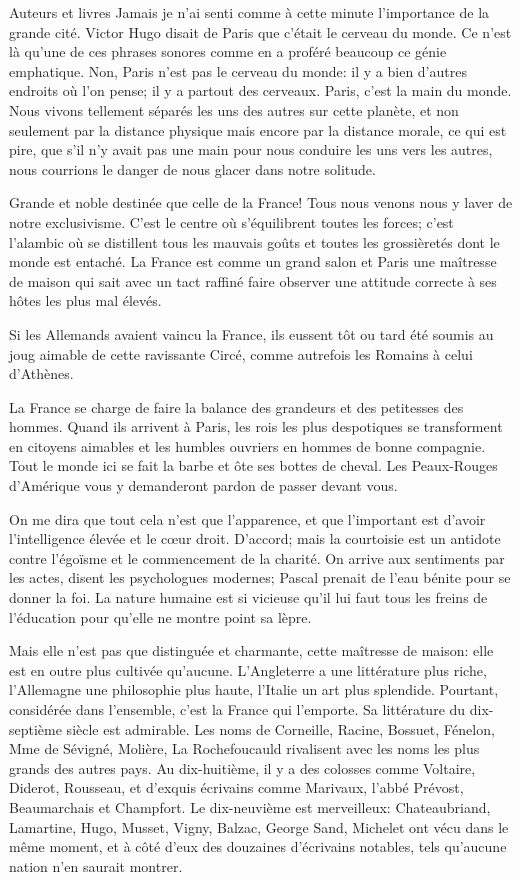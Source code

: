 \begin{chapter}{Auteurs et livres}
Jamais je n'ai senti comme à cette minute l'importance de la grande
cité. Victor Hugo disait de Paris que c'était le cerveau du monde. Ce
n'est là qu'une de ces phrases sonores comme en a proféré beaucoup ce
génie emphatique. Non, Paris n'est pas le cerveau du monde: il y a bien
d'autres endroits où l'on pense; il y a partout des cerveaux. Paris,
c'est la main du monde. Nous vivons tellement séparés les uns des autres
sur cette planète, et non seulement par la distance physique mais encore
par la distance morale, ce qui est pire, que s'il n'y avait pas une main
pour nous conduire les uns vers les autres, nous courrions le danger de
nous glacer dans notre solitude.

Grande et noble destinée que celle de la France! Tous nous venons nous y
laver de notre exclusivisme. C'est le centre où s'équilibrent toutes
les forces; c'est l'alambic où se distillent tous les mauvais goûts et
toutes les grossièretés dont le monde est entaché. La France est comme
un grand salon et Paris une maîtresse de maison qui sait avec un tact
raffiné faire observer une attitude correcte à ses hôtes les plus mal
élevés.

Si les Allemands avaient vaincu la France, ils eussent tôt ou tard été
soumis au joug aimable de cette ravissante Circé, comme autrefois les
Romains à celui d'Athènes.

La France se charge de faire la balance des grandeurs et des petitesses
des hommes. Quand ils arrivent à Paris, les rois les plus despotiques se
transforment en citoyens aimables et les humbles ouvriers en hommes de
bonne compagnie. Tout le monde ici se fait la barbe et ôte ses bottes de
cheval. Les Peaux-Rouges d'Amérique vous y demanderont pardon de passer
devant vous.

On me dira que tout cela n'est que l'apparence, et que l'important est
d'avoir l'intelligence élevée et le cœur droit. D'accord; mais la
courtoisie est un antidote contre l'égoïsme et le commencement de la
charité. On arrive aux sentiments par les actes, disent les psychologues
modernes; Pascal prenait de l'eau bénite pour se donner la foi. La
nature humaine est si vicieuse qu'il lui faut tous les freins de
l'éducation pour qu'elle ne montre point sa lèpre.

Mais elle n'est pas que distinguée et charmante, cette maîtresse de
maison: elle est en outre plus cultivée qu'aucune. L'Angleterre a une
littérature plus riche, l'Allemagne une philosophie plus haute, l'Italie
un art plus splendide. Pourtant, considérée dans l'ensemble, c'est la
France qui l'emporte. Sa littérature du dix-septième siècle est
admirable. Les noms de Corneille, Racine, Bossuet, Fénelon, Mme de
Sévigné, Molière, La Rochefoucauld rivalisent avec les noms les plus
grands des autres pays. Au dix-huitième, il y a des colosses comme
Voltaire, Diderot, Rousseau, et d'exquis écrivains comme Marivaux,
l'abbé Prévost, Beaumarchais et Champfort. Le dix-neuvième est
merveilleux: Chateaubriand, Lamartine, Hugo, Musset, Vigny, Balzac,
George Sand, Michelet ont vécu dans le même moment, et à côté d'eux des
douzaines d'écrivains notables, tels qu'aucune nation n'en saurait
montrer.


\end{chapter}
